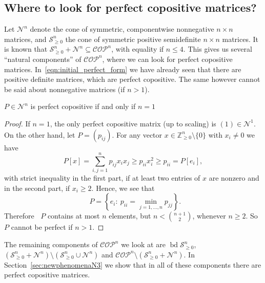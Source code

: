 \documentclass{commat}
\newcommand{\IZ}{{\mathbb{Z}}}
\DeclareMathOperator{\bd}{bd}
\newcommand{\sngeo}{{\mathcal{S}}^{n}_{\geq0}}
\newcommand{\nonn}{{\mathcal{N}^{n}}}
\newcommand{\IZngeo}{\IZ_{\geq0}^n}
\newcommand{\cop}{{\mathcal{COP}}}
\newcommand{\copn}{{\mathcal{COP}}^{n}}
\DeclareMathOperator{\MinC}{Min_{\cop}}
\begin{document}
\subsection*{Where to look for perfect copositive matrices?}
Let \(\nonn \) denote the cone of symmetric, componentwise nonnegative \(n\times n\) matrices, and
\(\sngeo \) the cone of symmetric positive semidefinite \(n\times n\) matrices.
It is known that \(\sngeo+\nonn\subseteq\copn \), with equality if \(n\leq4 \).
This gives us several ``natural components'' of \(\copn \),
where we can look for perfect copositive matrices.
In~\eqref{eqn:initial_perfect_form} we have already seen that there are positive definite matrices,
which are perfect copositive.
The same however cannot be said about nonnegative matrices (if \(n>1 \)).
\begin{lemma}\label{lem:nonnegnonperf}
    \(P\in\nonn \) is perfect copositive if and only if \(n=1 \)
\end{lemma}
\begin{proof}
    If \(n=1 \), the only perfect copositive matrix (up to scaling) is \((1) \in\mathcal{N}^1 \).
    On the other hand, let \(P=(p_{ij}) \).
    For any vector \(x\in\IZngeo\setminus\{0\} \) with \(x_i\neq0 \) we have
    \[
        P[x]=\sum_{i,j=1}^{n}p_{ij}x_ix_j\geq p_{ii}x_i^2 \geq p_{ii}=P[e_i],
    \]
    with strict inequality in the first part, if at least two entries of $x$ are nonzero
    and in the second part, if \(x_i \geq 2 \).
    Hence, we see that
    \[
        \MinC P=\left\{ e_i :\ p_{ii}=\min_{j=1,\dots,n}p_{jj} \right\}.
    \]
    Therefore \(\MinC P \) contains at most $n$ elements, but \(n<\binom{n+1}{2} \),
	whenever \(n\geq2 \).
	So $P$ cannot be perfect if \(n > 1 \).
\end{proof}
The remaining components of \(\copn \) we look at are \(\bd\sngeo \),
 \((\sngeo+\nonn)\setminus(\sngeo\cup\nonn) \) and \(\copn\setminus(\sngeo+\nonn) \).
In Section~\ref{sec:newphenomenaN3} we show that in all of these components there are perfect
copositive matrices.
\end{document}
